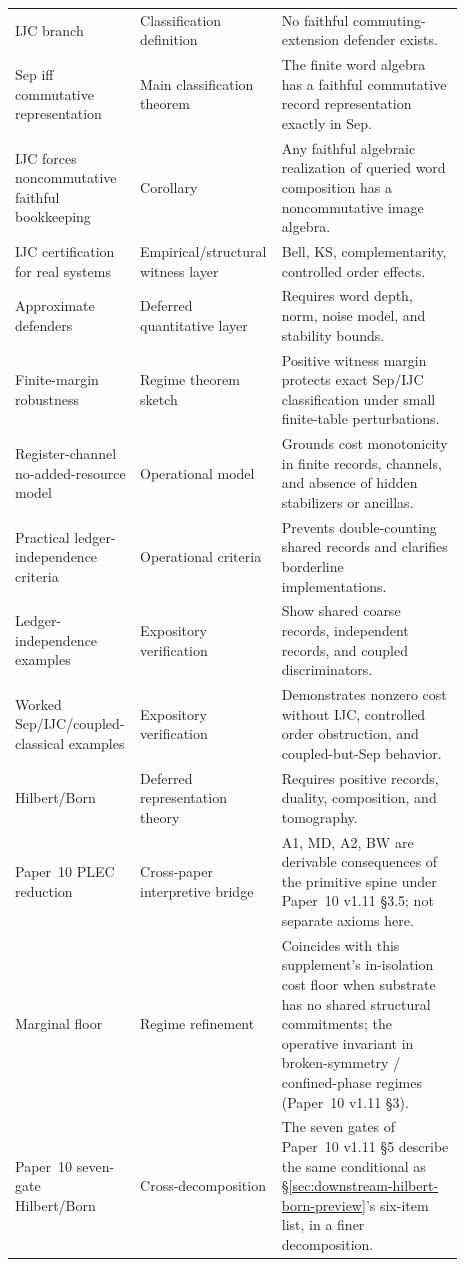 \documentclass[11pt]{article}
\begin{document}
\begin{center}
\begin{longtable}{@{}p{0.27\linewidth}p{0.22\linewidth}p{0.40\linewidth}@{}}
IJC branch & Classification definition & No faithful commuting-extension defender exists. \\
Sep iff commutative representation & Main classification theorem & The finite word algebra has a faithful commutative record representation exactly in Sep. \\
IJC forces noncommutative faithful bookkeeping & Corollary & Any faithful algebraic realization of queried word composition has a noncommutative image algebra. \\
IJC certification for real systems & Empirical/structural witness layer & Bell, KS, complementarity, controlled order effects. \\
Approximate defenders & Deferred quantitative layer & Requires word depth, norm, noise model, and stability bounds. \\
Finite-margin robustness & Regime theorem sketch & Positive witness margin protects exact Sep/IJC classification under small finite-table perturbations. \\
Register-channel no-added-resource model & Operational model & Grounds cost monotonicity in finite records, channels, and absence of hidden stabilizers or ancillas. \\
Practical ledger-independence criteria & Operational criteria & Prevents double-counting shared records and clarifies borderline implementations. \\
Ledger-independence examples & Expository verification & Show shared coarse records, independent records, and coupled discriminators. \\
Worked Sep/IJC/coupled-classical examples & Expository verification & Demonstrates nonzero cost without IJC, controlled order obstruction, and coupled-but-Sep behavior. \\
Hilbert/Born & Deferred representation theory & Requires positive records, duality, composition, and tomography. \\
Paper~10 PLEC reduction & Cross-paper interpretive bridge & A1, MD, A2, BW are derivable consequences of the primitive spine under Paper~10 v1.11 \S3.5; not separate axioms here. \\
Marginal floor & Regime refinement & Coincides with this supplement's in-isolation cost floor when substrate has no shared structural commitments; the operative invariant in broken-symmetry / confined-phase regimes (Paper~10 v1.11 \S3). \\
Paper~10 seven-gate Hilbert/Born & Cross-decomposition & The seven gates of Paper~10 v1.11 \S5 describe the same conditional as \S\ref{sec:downstream-hilbert-born-preview}'s six-item list, in a finer decomposition. \\
\bottomrule
\end{longtable}
\end{center}
\end{document}
